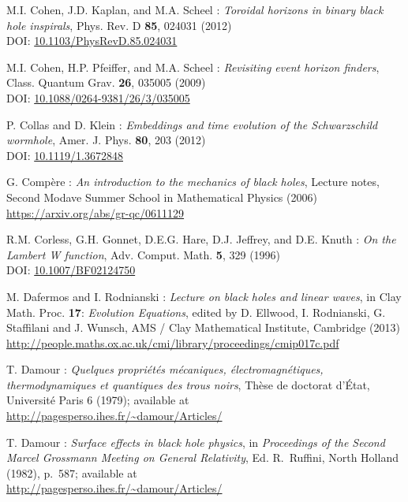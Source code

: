 \begin{thebibliography}{123}
M.I. Cohen, J.D. Kaplan, and M.A. Scheel :
{\em Toroidal horizons in binary black hole inspirals},
Phys. Rev. D {\bf 85}, 024031 (2012)\\
DOI:  \href{https://doi.org/10.1103/PhysRevD.85.024031}{10.1103/PhysRevD.85.024031}

M.I. Cohen, H.P. Pfeiffer, and M.A. Scheel :
{\em Revisiting event horizon finders},
Class. Quantum Grav. {\bf 26}, 035005 (2009)\\
DOI: \href{https://doi.org/10.1088/0264-9381/26/3/035005}{10.1088/0264-9381/26/3/035005}

P. Collas and D. Klein :
{\em Embeddings and time evolution of the Schwarzschild wormhole},
Amer. J. Phys. {\bf 80}, 203 (2012)\\
DOI: \href{https://doi.org/10.1119/1.3672848}{10.1119/1.3672848}

G. Compère :
{\em An introduction to the mechanics of black holes},
Lecture notes, Second Modave Summer School in Mathematical Physics (2006)\\
\url{https://arxiv.org/abs/gr-qc/0611129}

R.M. Corless, G.H. Gonnet, D.E.G. Hare, D.J. Jeffrey, and D.E. Knuth :
{\em On the Lambert W function},
Adv. Comput. Math. {\bf 5}, 329 (1996)\\
DOI: \href{https://doi.org/10.1007/BF02124750}{10.1007/BF02124750}

M. Dafermos and I. Rodnianski : {\em Lecture on black holes and linear waves},
in  Clay Math. Proc. {\bf 17}: {\em Evolution Equations}, edited by
D. Ellwood, I. Rodnianski, G. Staffilani and J. Wunsch, AMS / Clay Mathematical Institute,
Cambridge (2013) \\
\url{http://people.maths.ox.ac.uk/cmi/library/proceedings/cmip017c.pdf}

T. Damour : {\em Quelques propri\'et\'es m\'ecaniques, \'electromagn\'etiques,
thermo\-dy\-na\-mi\-ques et quantiques des trous noirs},
Th\`ese de doctorat d'\'Etat, Universit\'e Paris 6 (1979); available at\\
\url{http://pagesperso.ihes.fr/~damour/Articles/}

T. Damour : {\em Surface effects in black hole physics},
in {\em Proceedings of the Second Marcel Grossmann Meeting on General
Relativity}, Ed. R.~Ruffini, North Holland (1982), p.~587; available at\\
\url{http://pagesperso.ihes.fr/~damour/Articles/}


\end{thebibliography}

